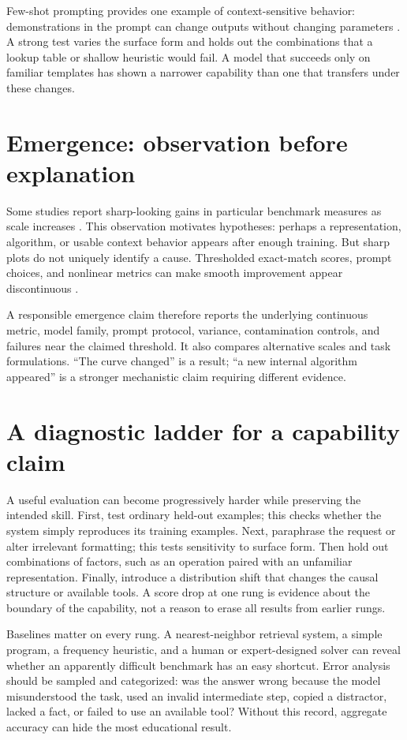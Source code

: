 \documentclass[11pt]{article}
\begin{document}
Few-shot prompting provides one example of context-sensitive behavior: demonstrations in the prompt can change outputs without changing parameters \cite{brown2020language}. A strong test varies the surface form and holds out the combinations that a lookup table or shallow heuristic would fail. A model that succeeds only on familiar templates has shown a narrower capability than one that transfers under these changes.

\section{Emergence: observation before explanation}
Some studies report sharp-looking gains in particular benchmark measures as scale increases \cite{wei2022emergent}. This observation motivates hypotheses: perhaps a representation, algorithm, or usable context behavior appears after enough training. But sharp plots do not uniquely identify a cause. Thresholded exact-match scores, prompt choices, and nonlinear metrics can make smooth improvement appear discontinuous \cite{schaeffer2023mirage}.

A responsible emergence claim therefore reports the underlying continuous metric, model family, prompt protocol, variance, contamination controls, and failures near the claimed threshold. It also compares alternative scales and task formulations. ``The curve changed'' is a result; ``a new internal algorithm appeared'' is a stronger mechanistic claim requiring different evidence.

\section{A diagnostic ladder for a capability claim}
A useful evaluation can become progressively harder while preserving the intended skill. First, test ordinary held-out examples; this checks whether the system simply reproduces its training examples. Next, paraphrase the request or alter irrelevant formatting; this tests sensitivity to surface form. Then hold out combinations of factors, such as an operation paired with an unfamiliar representation. Finally, introduce a distribution shift that changes the causal structure or available tools. A score drop at one rung is evidence about the boundary of the capability, not a reason to erase all results from earlier rungs.

Baselines matter on every rung. A nearest-neighbor retrieval system, a simple program, a frequency heuristic, and a human or expert-designed solver can reveal whether an apparently difficult benchmark has an easy shortcut. Error analysis should be sampled and categorized: was the answer wrong because the model misunderstood the task, used an invalid intermediate step, copied a distractor, lacked a fact, or failed to use an available tool? Without this record, aggregate accuracy can hide the most educational result.
\end{document}
